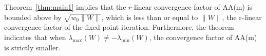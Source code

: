 \documentclass[11pt]{article}
\begin{document}
{\color{black}Theorem~\ref{thm:main1} implies that the $r$-linear convergence factor of AA(m) is bounded above by  $\sqrt{w_0\|W\|}$, which is less than or equal to $\|W\|$, the r-linear convergence factor of the fixed-point iteration. Furthermore, the theorem indicates that when  
$\lambda_{\max}(W)\neq -\lambda_{\min}(W)$, the convergence factor of AA(m) is strictly smaller. 

}
\end{document}
